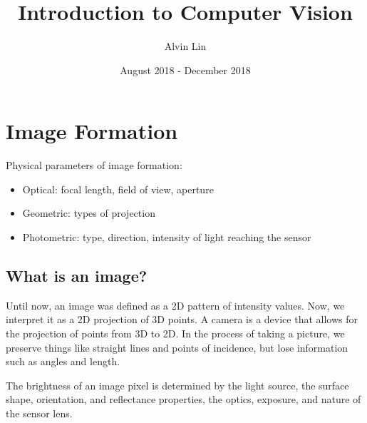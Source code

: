 \documentclass{math}
\title{Introduction to Computer Vision}
\author{Alvin Lin}
\date{August 2018 - December 2018}
\begin{document}
\maketitle

\section*{Image Formation}
Physical parameters of image formation:
\begin{itemize}
  \item Optical: focal length, field of view, aperture
  \item Geometric: types of projection
  \item Photometric: type, direction, intensity of light reaching the sensor
\end{itemize}

\subsection*{What is an image?}
Until now, an image was defined as a 2D pattern of intensity values. Now, we
interpret it as a 2D projection of 3D points. A camera is a device that allows
for the projection of points from 3D to 2D. In the process of taking a picture,
we preserve things like straight lines and points of incidence, but lose
information such as angles and length. \par
The brightness of an image pixel is determined by the light source, the surface
shape, orientation, and reflectance properties, the optics, exposure, and nature
of the sensor lens.
\end{document}

